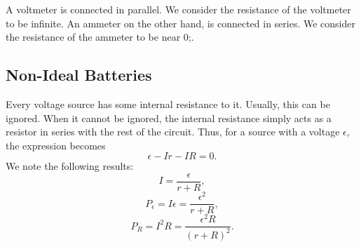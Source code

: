 \documentclass[11pt]{article}
\theoremstyle{plain} %
\theoremstyle{definition}
\theoremstyle{example}
\theoremstyle{remark}
\begin{document}
A voltmeter is connected in parallel. We consider the resistance of the voltmeter to be infinite. An ammeter on the other hand, is connected in series. We consider the resistance of the ammeter to be near 0;. 

\subsection{Non-Ideal Batteries}
Every voltage source  has some internal resistance to it. Usually, this can be ignored. When it cannot be ignored, the internal resistance simply acts as a resistor in series with the rest of the circuit. Thus, for a source with a voltage $\epsilon$, the expression becomes 
$$\epsilon - Ir - IR = 0.$$
We note the following results:
$$I = \frac{\epsilon}{r+R},$$
$$P_{\epsilon} = I\epsilon = \frac{\epsilon^2}{r+R},$$
$$P_R = I^2R = \frac{\epsilon^2R}{(r+R)^2}.$$
\end{document}
